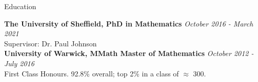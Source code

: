 \documentclass{resume} %
\begin{document}

\begin{rSection}{Education}

{\bf The University of Sheffield, PhD in Mathematics} \hfill {\em October 2016 - March 2021} \\ 
Supervisor: Dr. Paul Johnson \smallskip \\
{\bf University of Warwick, MMath Master of Mathematics} \hfill {\em October 2012 - July 2016} \\
First Class Honours. 92.8\% overall; top 2\% in a class of $\approx$ 300.

\end{rSection}

\end{document}
